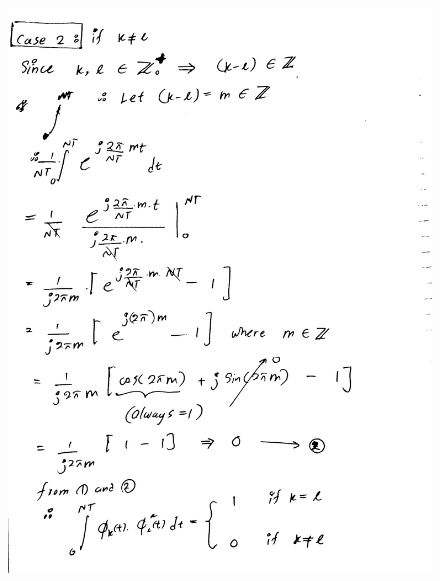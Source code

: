 \documentclass[a4paper,11pt]{article}%
\begin{document}
\begin{figure}[!h]
	\includegraphics[scale=0.22]{figures/img1}
\end{figure}
\end{document}
